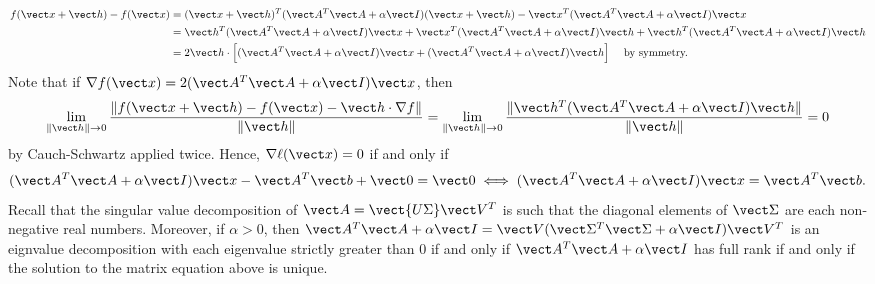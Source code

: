 \documentclass{homework}
\begin{document}
\begin{longproblem}
\begin{solution}
\begin{align*}
  f(\vect x + \vect h) - f(\vect x) 
  &= (\vect x + \vect h)^T (\vect A^T \vect A + \alpha \vect I)(\vect x + \vect h) - \vect x^T (\vect A^T \vect A + \alpha \vect I)\vect x\\
  &= \vect h^T (\vect A^T \vect A + \alpha \vect I)\vect x +\vect x^T(\vect A^T \vect A + \alpha \vect I)\vect h + \vect h^T (\vect A^T \vect A + \alpha \vect I)\vect h\\
  &= 2 \vect h \cdot \Big[ (\vect A^T \vect A + \alpha \vect I)\vect x + (\vect A^T \vect A + \alpha \vect I)\vect h\Big ]\quad\text{ by symmetry.}\\
  \end{align*}
  Note that if $\nabla f(\vect x) = 2(\vect A^T \vect A + \alpha \vect I)\vect x$, then 
$$
  \lim_{\|\vect h\| \to 0} \frac{\|f(\vect x + \vect h) - f(\vect x) - \vect h \cdot \nabla f\|}{\|\vect h\|} = 
  \lim_{\|\vect h\| \to 0} \frac{\|\vect h^T (\vect A^T\vect A + \alpha\vect I)\vect h\|}{\|\vect h\|} = 0  
$$
by Cauch-Schwartz applied twice.
Hence, $\nabla \ell (\vect x) = 0$ if and only if
$$
   (\vect A^T \vect A + \alpha \vect I)\vect x - \vect A^T \vect b  + \vect 0 = \vect0 \iff (\vect A^T \vect A + \alpha \vect I)\vect x = \vect A^T \vect b.
$$
Recall that the singular
value decomposition of $\vect A =  \vect{U \Sigma}\vect V^T$ is such that
the diagonal elements of $\vect \Sigma$ are each non-negative real numbers. Moreover, if $\alpha > 0$, then $\vect A^T\vect A + \alpha \vect I = \vect V(\vect \Sigma^T\vect\Sigma + \alpha\vect I)\vect V^T$ is an eignvalue decomposition with each eigenvalue strictly greater than 0 if and only if $\vect A^T \vect A + \alpha \vect I$ has full rank if and only if the solution to the matrix equation above is unique.

\end{solution}



\end{longproblem}
\end{document}
